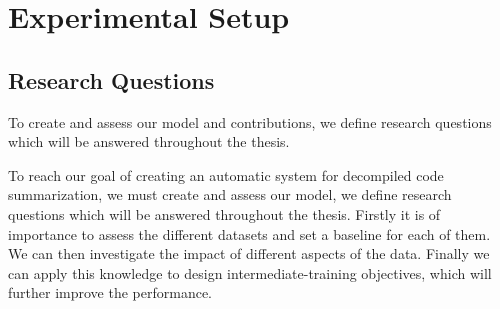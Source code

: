 \chapter{Experimental Setup}
\label{ExperimentalSetup}


\section{Research Questions}
To create and assess our model and contributions, we define research questions which will be answered throughout the thesis.

To reach our goal of creating an automatic system for decompiled code summarization, we must create and assess our model, we define research questions which will be answered throughout the thesis. Firstly it is of importance to assess the different datasets and set a baseline for each of them. We can then investigate the impact of different aspects of the data. Finally we can apply this knowledge to design intermediate-training objectives, which will further improve the performance.


